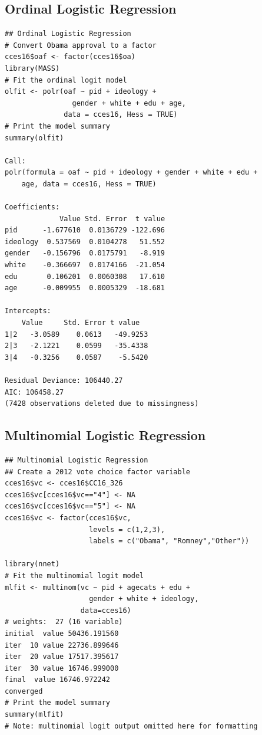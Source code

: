 \documentclass[12pt, letterpaper,notitlepage]{article}
\begin{document}
\subsection{Ordinal Logistic Regression}
\begin{lstlisting}
## Ordinal Logistic Regression
# Convert Obama approval to a factor
cces16$oaf <- factor(cces16$oa)
library(MASS)
# Fit the ordinal logit model
olfit <- polr(oaf ~ pid + ideology +
                gender + white + edu + age,
              data = cces16, Hess = TRUE)
# Print the model summary
summary(olfit)

Call:
polr(formula = oaf ~ pid + ideology + gender + white + edu + 
    age, data = cces16, Hess = TRUE)

Coefficients:
             Value Std. Error  t value
pid      -1.677610  0.0136729 -122.696
ideology  0.537569  0.0104278   51.552
gender   -0.156796  0.0175791   -8.919
white    -0.366697  0.0174166  -21.054
edu       0.106201  0.0060308   17.610
age      -0.009955  0.0005329  -18.681

Intercepts:
    Value     Std. Error t value  
1|2   -3.0589    0.0613   -49.9253
2|3   -2.1221    0.0599   -35.4338
3|4   -0.3256    0.0587    -5.5420

Residual Deviance: 106440.27 
AIC: 106458.27 
(7428 observations deleted due to missingness)
\end{lstlisting}

\newpage

\subsection{Multinomial Logistic Regression}
\begin{lstlisting}
## Multinomial Logistic Regression
## Create a 2012 vote choice factor variable
cces16$vc <- cces16$CC16_326
cces16$vc[cces16$vc=="4"] <- NA
cces16$vc[cces16$vc=="5"] <- NA
cces16$vc <- factor(cces16$vc,
                    levels = c(1,2,3),
                    labels = c("Obama", "Romney","Other"))

library(nnet)
# Fit the multinomial logit model
mlfit <- multinom(vc ~ pid + agecats + edu + 
                    gender + white + ideology,
                  data=cces16)
# weights:  27 (16 variable)
initial  value 50436.191560 
iter  10 value 22736.899646
iter  20 value 17517.395617
iter  30 value 16746.999000
final  value 16746.972242 
converged
# Print the model summary
summary(mlfit)
# Note: multinomial logit output omitted here for formatting
\end{lstlisting}
\end{document}

